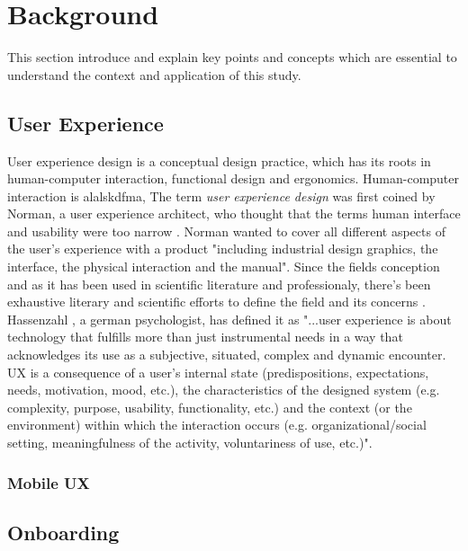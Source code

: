 \chapter{Background}
\label{chap:background}
This section introduce and explain key points and concepts which are essential to understand the context and application of this study.

\section{User Experience}
User experience design is a conceptual design practice, which has its roots in human-computer interaction, functional design and ergonomics. Human-computer interaction is alalskdfma, The term \textit{user experience design} was first coined by Norman, a user experience architect, who thought that the terms human interface and usability were too narrow \cite{Merholz2008}. Norman wanted to cover all different aspects of the user's experience with a product "including industrial design graphics, the interface, the physical interaction and the manual". Since the fields conception and as it has been used in scientific literature and professionaly, there's been exhaustive literary and scientific efforts to define the field and its concerns \cite{Law2008} \cite{Law2009} \cite{Forlizzi2000}. Hassenzahl \cite{Hassenzahl2006}, a german psychologist, has defined it as "...user experience is about technology that fulfills more than just instrumental needs in a way that acknowledges its use as a subjective, situated, complex and dynamic encounter. UX is a consequence of a user’s internal state (predispositions, expectations, needs, motivation, mood, etc.), the characteristics of the designed system (e.g. complexity, purpose, usability, functionality, etc.) and the context (or the environment) within which the interaction occurs (e.g. organizational/social setting, meaningfulness of the activity, voluntariness of use, etc.)".

\subsection{Mobile UX}

\section{Onboarding}

